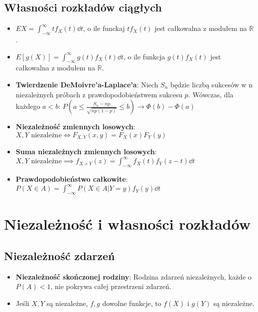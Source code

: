 \documentclass{article}
\theoremstyle{definition}
\theoremstyle{remark}
\begin{document}
\begin{multicols}{2}
    \subsection*{Własności rozkładów ciągłych}

    \begin{itemize}[itemsep=0pt, left=0pt]
        \item \(EX = \int_{-\infty}^{\infty}{tf_X(t) \dd{t}}\), o ile funckaj \(tf_X(t)\) jest całkowalna z modułem na \(\mathbb{R}\).
        \item \(E[g(X)] = \int_{-\infty}^{\infty}{g(t)f_X(t) \dd{t}}\), o ile funkcja \(g(t)f_X(t)\) jest całkowalna z modułem na \(\mathbb{R}\).
        \item \textbf{Twierdzenie DeMoivre'a-Laplace'a}: Niech \(S_n\) będzie liczbą sukcesów w n niezależnych próbach z
        prawdopodobieństwem sukcesu \(p\). Wówczas, dla każdego \(a < b\): \(P(a \leq \frac{S_n - np}{\sqrt{np(1-p)}} \leq b) \to \Phi(b) - \Phi(a)\)
        \item \textbf{Niezależność zmiennych losowych}: \(X,Y \text{ niezależne} \iff F_{X,Y}(x,y) = F_X(x)F_Y(y)\)
        \item \textbf{Suma niezależnych zmiennych losowych}: \(X,Y \text{ niezależne} \implies f_{X+Y}(z) = \int_{-\infty}^{\infty}{f_X(t)f_Y(z-t) \dd{t}}\)
        \item \textbf{Prawdopodobieństwo całkowite}: \(P(X \in A) = \int_{-\infty}^{\infty}{P(X \in A | Y = y) f_Y(y) \dd{t}}\)
    \end{itemize}


    \section*{Niezależność i własności rozkładów}

    \subsection*{Niezależność zdarzeń}
    \begin{itemize}[itemsep=0pt, left=0pt]
        \item \textbf{Niezależność skończonej rodziny}: Rodzina zdarzeń niezależnych, każde o \( P(A) < 1 \), nie pokrywa całej przestrzeni zdarzeń.
        \item Jeśli \( X, Y \) są niezależne, \( f, g \) dowolne funkcje, to \( f(X) \) i \( g(Y) \) są niezależne.
    \end{itemize}
    

\end{multicols}
\end{document}
